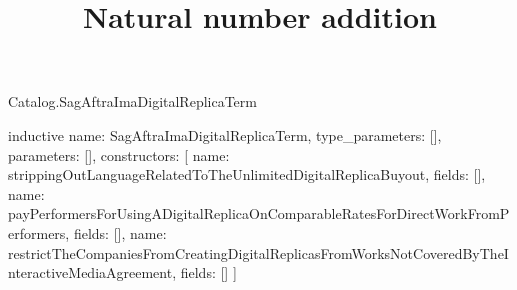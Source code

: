 \begin{lexlean}{Catalog.SagAftraImaDigitalReplicaTerm}
\title{Natural number addition}
\begin{semanticmodule}
inductive{
  name: SagAftraImaDigitalReplicaTerm,
  type_parameters: [],
  parameters: [],
  constructors: [
    {name: strippingOutLanguageRelatedToTheUnlimitedDigitalReplicaBuyout, fields: []},
    {name: payPerformersForUsingADigitalReplicaOnComparableRatesForDirectWorkFromPerformers, fields: []},
    {name: restrictTheCompaniesFromCreatingDigitalReplicasFromWorksNotCoveredByTheInteractiveMediaAgreement, fields: []}
  ]
}
\end{semanticmodule}
\end{lexlean}
